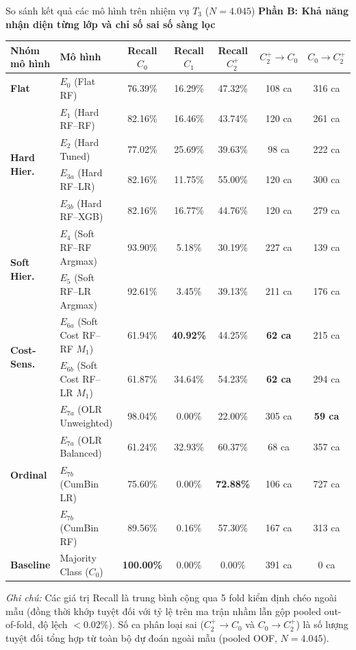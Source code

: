 \begin{table}{So sánh kết quả các mô hình trên nhiệm vụ $T_3$ ($N = 4.045$)}
\vspace{0.35cm}
\textbf{Phần B: Khả năng nhận diện từng lớp và chỉ số sai số sàng lọc}
\vspace{0.15cm}

\begin{tabularx}{\textwidth}{l X c c c c c}
\toprule
\textbf{Nhóm mô hình} & \textbf{Mô hình} & \textbf{Recall $C_0$} & \textbf{Recall $C_1$} & \textbf{Recall $C_2^+$} & \textbf{$C_2^+ \to C_0$} & \textbf{$C_0 \to C_2^+$} \\
\midrule
\textbf{Flat} & $E_0$ (Flat RF) & 76.39\% & 16.29\% & 47.32\% & 108 ca & 316 ca \\
\midrule
\multirow{4}{*}{\textbf{Hard Hier.}} 
  & $E_1$ (Hard RF--RF)   & 82.16\% & 16.46\% & 43.74\% & 120 ca & 261 ca \\
  & $E_2$ (Hard Tuned)    & 77.02\% & 25.69\% & 39.63\% & 98 ca & 222 ca \\
  & $E_{3a}$ (Hard RF--LR) & 82.16\% & 11.75\% & 55.00\% & 120 ca & 300 ca \\
  & $E_{3b}$ (Hard RF--XGB)& 82.16\% & 16.77\% & 44.76\% & 120 ca & 279 ca \\
\midrule
\multirow{2}{*}{\textbf{Soft Hier.}} 
  & $E_4$ (Soft RF--RF Argmax) & 93.90\% & 5.18\% & 30.19\% & 227 ca & 139 ca \\
  & $E_5$ (Soft RF--LR Argmax) & 92.61\% & 3.45\% & 39.13\% & 211 ca & 176 ca \\
\midrule
\multirow{2}{*}{\textbf{Cost-Sens.}}
  & $E_{6a}$ (Soft Cost RF--RF $M_1$) & 61.94\% & \textbf{40.92\%} & 44.25\% & \textbf{62 ca} & 215 ca \\
  & $E_{6b}$ (Soft Cost RF--LR $M_1$) & 61.87\% & 34.64\% & 54.23\% & \textbf{62 ca} & 294 ca \\
\midrule
\multirow{4}{*}{\textbf{Ordinal}} 
  & $E_{7a}$ (OLR Unweighted) & 98.04\% & 0.00\% & 22.00\% & 305 ca & \textbf{59 ca} \\
  & $E_{7a}$ (OLR Balanced)   & 61.24\% & 32.93\% & 60.37\% & 68 ca & 357 ca \\
  & $E_{7b}$ (CumBin LR)      & 75.60\% & 0.00\% & \textbf{72.88\%} & 106 ca & 727 ca \\
  & $E_{7b}$ (CumBin RF)      & 89.56\% & 0.16\% & 57.30\% & 167 ca & 313 ca \\
\midrule
\textbf{Baseline} & Majority Class ($C_0$) & \textbf{100.00\%} & 0.00\% & 0.00\% & 391 ca & 0 ca \\
\bottomrule
\end{tabularx}

\vspace{0.15cm}
\raggedright
\scriptsize
\textit{Ghi chú:} Các giá trị Recall là trung bình cộng qua 5 fold kiểm định chéo ngoài mẫu (đồng thời khớp tuyệt đối với tỷ lệ trên ma trận nhầm lẫn gộp pooled out-of-fold, độ lệch $< 0.02\%$). Số ca phân loại sai ($C_2^+ \to C_0$ và $C_0 \to C_2^+$) là số lượng tuyệt đối tổng hợp từ toàn bộ dự đoán ngoài mẫu (pooled OOF, $N = 4.045$).
\end{table}
